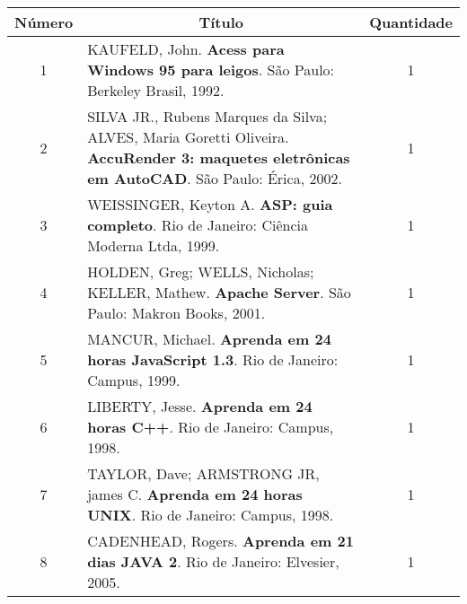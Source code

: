 \begin{longtable}{|c|p{115mm}|c|}
\hline
Número & \multicolumn{1}{c|}{Título}                                                           & Quantidade \\ \hline 
1      & KAUFELD, John. \textbf{Acess para Windows 95 para leigos}. São Paulo: Berkeley Brasil, 1992.& 1          \\ \hline
2     & SILVA JR., Rubens Marques da Silva; ALVES, Maria Goretti Oliveira. \textbf{AccuRender 3: maquetes eletrônicas em AutoCAD}. São Paulo: Érica, 2002. & 1          \\ \hline
3     & WEISSINGER, Keyton A. \textbf{ASP: guia completo}. Rio de Janeiro: Ciência Moderna Ltda, 1999. & 1          \\ \hline
4     & HOLDEN, Greg; WELLS, Nicholas; KELLER, Mathew. \textbf{Apache Server}. São Paulo: Makron Books, 2001. & 1          \\ \hline
5      & MANCUR, Michael. \textbf{Aprenda em 24 horas JavaScript 1.3}. Rio de Janeiro: Campus, 1999. & 1          \\ \hline
6     & LIBERTY, Jesse. \textbf{Aprenda em 24 horas C++}. Rio de Janeiro: Campus, 1998.       & 1          \\ \hline
7     & TAYLOR, Dave; ARMSTRONG JR, james C. \textbf{Aprenda em 24 horas UNIX}. Rio de Janeiro: Campus, 1998. & 1          \\ \hline
8     & CADENHEAD, Rogers. \textbf{Aprenda em 21 dias JAVA 2}. Rio de Janeiro: Elvesier, 2005.& 1          \\ \hline


\end{longtable}
